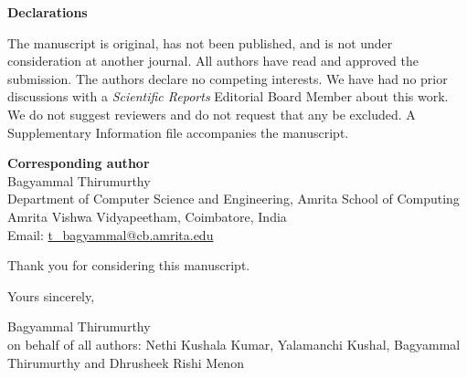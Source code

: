 \documentclass[11pt,a4paper]{article}
\begin{document}
\textbf{Declarations}

The manuscript is original, has not been published, and is not under consideration at another journal. All authors have read and approved the submission. The authors declare no competing interests. We have had no prior discussions with a \textit{Scientific Reports} Editorial Board Member about this work. We do not suggest reviewers and do not request that any be excluded. A Supplementary Information file accompanies the manuscript.

\textbf{Corresponding author}\\
Bagyammal Thirumurthy\\
Department of Computer Science and Engineering, Amrita School of Computing\\
Amrita Vishwa Vidyapeetham, Coimbatore, India\\
Email: \href{mailto:t_bagyammal@cb.amrita.edu}{t\_bagyammal@cb.amrita.edu}

Thank you for considering this manuscript.

Yours sincerely,

Bagyammal Thirumurthy\\
on behalf of all authors: Nethi Kushala Kumar, Yalamanchi Kushal, Bagyammal Thirumurthy and Dhrusheek Rishi Menon
\end{document}
